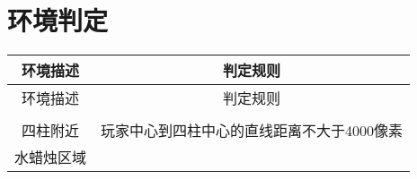 \chapter{环境判定}
\begin{longtable}{c|c}
环境描述&判定规则\\\hline
\endfirsthead
环境描述&判定规则\\\hline
\endhead
\\\hline
\endfoot
四柱附近&玩家中心到四柱中心的直线距离不大于4000像素\\\hline
水蜡烛区域&
\end{longtable}